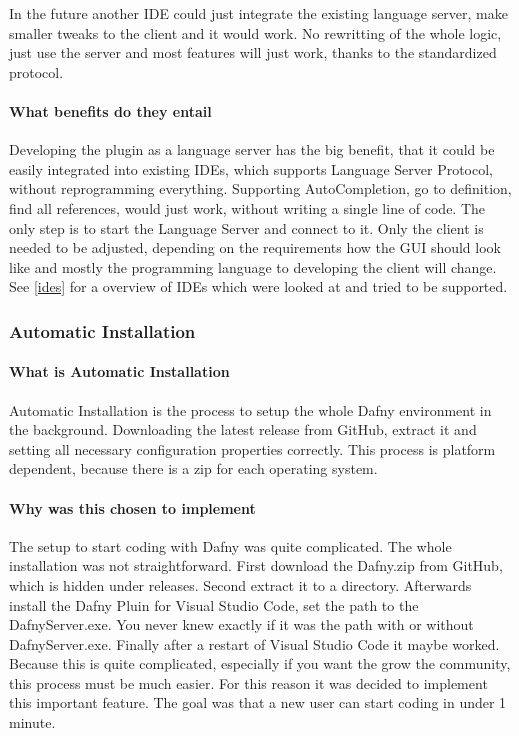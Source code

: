 In the future another IDE could just integrate the existing language server, make smaller tweaks to the client and it would work. No rewritting of the whole logic, just use the server and most features will just work, thanks to the standardized protocol. 

\paragraph{What benefits do they entail}
Developing the plugin as a language server has the big benefit, that it could be easily integrated into existing IDEs, which supports Language Server Protocol, without reprogramming everything. Supporting AutoCompletion, go to definition, find all references, would just work, without writing a single line of code. The only step is to start the Language Server and connect to it. Only the client is needed to be adjusted, depending on the requirements how the GUI should look like and mostly the programming language to developing the client will change. 
See \ref{ides} for a overview of IDEs which were looked at and tried to be supported. 


\subsubsection{Automatic Installation} \label{setupAutomaticInstallation}

\paragraph{What is Automatic Installation}
Automatic Installation is the process to setup the whole Dafny environment in the background. Downloading the latest release from GitHub, extract it and setting all necessary configuration properties correctly. This process is platform dependent, because there is a zip for each operating system. 


\paragraph{Why was this chosen to implement}
The setup to start coding with Dafny was quite complicated. The whole installation was not straightforward. First download the Dafny.zip from GitHub, which is hidden under releases. Second extract it to a directory. Afterwards install the Dafny Pluin for Visual Studio Code, set the path to the DafnyServer.exe. You never knew exactly if it was the path with or without DafnyServer.exe. Finally after a restart of Visual Studio Code it maybe worked. \newline
Because this is quite complicated, especially if you want the grow the community, this process must be much easier. For this reason it was decided to implement this important feature. The goal was that a new user can start coding in under 1 minute. 

